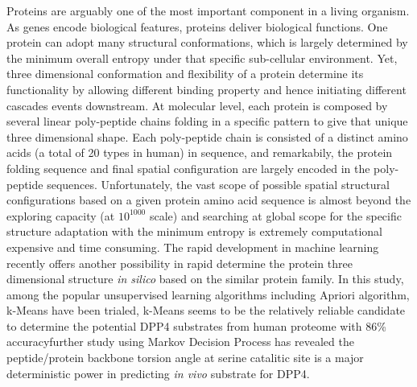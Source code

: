 Proteins are arguably one of the most important component in a living organism. As genes encode biological features, proteins deliver biological functions. One protein can adopt many structural conformations, which is largely determined by the minimum overall entropy under that specific sub-cellular environment. Yet, three dimensional conformation and flexibility of a protein determine its functionality by allowing different binding property and hence initiating different cascades events downstream. At molecular level, each protein is composed by several linear poly-peptide chains folding in a specific pattern to give that unique three dimensional shape. Each poly-peptide chain is consisted of a distinct amino acids (a total of 20 types in human) in sequence, and remarkabily, the protein folding sequence and final spatial configuration are largely encoded in the poly-peptide sequences. Unfortunately, the vast scope of possible spatial structural configurations based on a given protein amino acid sequence is almost beyond the exploring capacity (at $10^{1000}$ scale) and searching at global scope for the specific structure adaptation with the minimum entropy is extremely computational expensive and time consuming. The rapid development in machine learning recently offers another possibility in rapid determine the protein three dimensional structure \textit{in silico} based on the similar protein family. In this study, among the popular unsupervised learning algorithms including Apriori algorithm, k-Means have been trialed, k-Means seems to be the relatively reliable candidate to determine the potential DPP4 substrates from human proteome with 86\% accuracyfurther study using Markov Decision Process has revealed the peptide/protein backbone torsion angle at serine catalitic site is a major deterministic power in predicting \textit{in vivo} substrate for DPP4. 